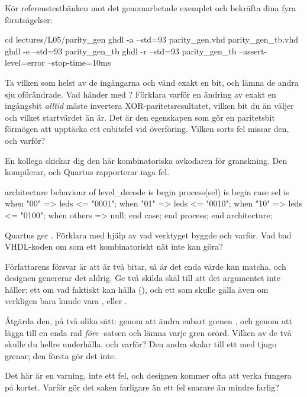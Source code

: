  Kör referenstestbänken mot det genomarbetade exemplet och bekräfta dina fyra
förutsägelser:

\begin{shell}
cd lectures/L05/parity_gen
ghdl -a --std=93 parity_gen.vhd parity_gen_tb.vhd
ghdl -e --std=93 parity_gen_tb
ghdl -r --std=93 parity_gen_tb --assert-level=error --stop-time=10ms
\end{shell}

 Ta vilken som helst av de ingångarna och vänd exakt en bit, och lämna de andra sju
oförändrade. Vad händer med ? Förklara varför en ändring av exakt en ingångsbit
\emph{alltid} måste invertera XOR-paritetsresultatet, vilken bit du än väljer och vilket
startvärdet än är. Det är den egenskapen som gör en paritetsbit förmögen att upptäcka ett
enbitsfel vid överföring. Vilken sorts fel missar den, och varför?

\label{c5:ex:latch}
En kollega skickar dig den här kombinatoriska avkodaren för granskning. Den kompilerar, och Quartus
rapporterar inga fel.

\begin{vhdlcode}
architecture behaviour of level_decode is
begin
    process(sel) is
    begin
        case sel is
            when "00"   => leds <= "0001";
            when "01"   => leds <= "0010";
            when "10"   => leds <= "0100";
            when others => null;
        end case;
    end process;
end architecture;
\end{vhdlcode}

 Quartus ger . Förklara med hjälp av
 vad verktyget byggde och varför. Vad bad VHDL-koden om som ett kombinatoriskt
nät inte kan göra?

 Författarens försvar är att  är två bitar, så  är det enda värde
 kan matcha, och designen genererar det aldrig. Ge två skilda skäl till att det
argumentet inte håller: ett om vad  faktiskt kan hålla (), och ett
som skulle gälla även om  verkligen bara kunde vara ,  eller
.

 Åtgärda den, på två olika sätt: genom att ändra enbart grenen , och
genom att lägga till en enda rad \emph{före} -satsen och lämna varje gren orörd. Vilken
av de två skulle du hellre underhålla, och varför? Den andra skalar till ett  med tjugo
grenar; den första gör det inte.

 Det här är en varning, inte ett fel, och designen kommer ofta att verka fungera på
kortet. Varför gör det saken farligare än ett fel snarare än mindre farlig?

